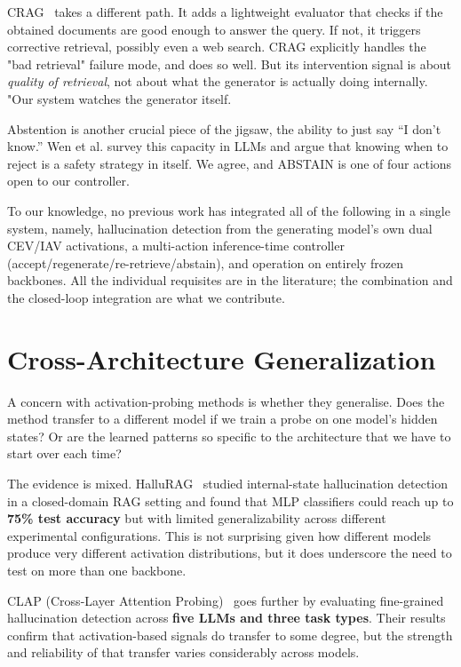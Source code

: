 CRAG~\cite{yan2024crag} takes a different path. It adds a lightweight evaluator that checks if the obtained documents are good enough to answer the query. If not, it triggers corrective retrieval, possibly even a web search. CRAG explicitly handles the "bad retrieval" failure mode, and does so well. But its intervention signal is about \emph{quality of retrieval}, not about what the generator is actually doing internally. "Our system watches the generator itself.

Abstention is another crucial piece of the jigsaw, the ability to just say ``I don't know.'' Wen et al. \cite{wen2024abstention} survey this capacity in LLMs and argue that knowing when to reject is a safety strategy in itself. We agree, and ABSTAIN is one of four actions open to our controller.

To our knowledge, no previous work has integrated all of the following in a single system, namely, hallucination detection from the generating model's own dual CEV/IAV activations, a multi-action inference-time controller (accept/regenerate/re-retrieve/abstain), and operation on entirely frozen backbones. All the individual requisites are in the literature;  the combination and the closed-loop integration are what we contribute.

\section{Cross-Architecture Generalization}
\label{sec:lit_crossarch}

A concern with activation-probing methods is whether they generalise. Does the method transfer to a different model if we train a probe on one model's hidden states? Or are the learned patterns so specific to the architecture that we have to start over each time?

The evidence is mixed. HalluRAG~\cite{frohling2024hallurag} studied internal-state hallucination detection in a closed-domain RAG setting and found that MLP classifiers could reach up to \textbf{75\% test accuracy} but with limited generalizability across different experimental configurations. This is not surprising given how different models produce very different activation distributions, but it does underscore the need to test on more than one backbone.

CLAP (Cross-Layer Attention Probing)~\cite{zhao2024clap} goes further by evaluating fine-grained hallucination detection across \textbf{five LLMs and three task types}. Their results confirm that activation-based signals do transfer to some degree, but the strength and reliability of that transfer varies considerably across models.

